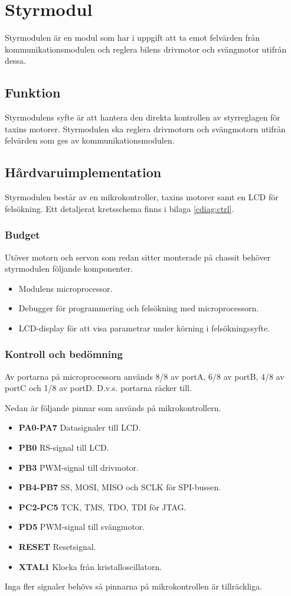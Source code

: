 \documentclass[designspec/spec.tex]{subfiles}
\begin{document}
\section{Styrmodul}
Styrmodulen är en modul som har i uppgift att ta emot felvärden från
kommunikationsmodulen och reglera bilens drivmotor och svängmotor utifrån
dessa.

\subsection{Funktion}
Styrmodulens syfte är att hantera den direkta kontrollen av styrreglagen för
taxins motorer. Styrmodulen ska reglera drivmotorn och svängmotorn utifrån
felvärden som ges av kommunikationsmodulen.

\subsection{Hårdvaruimplementation}
Styrmodulen består av en mikrokontroller, taxins motorer samt en LCD för
felsökning. Ett detaljerat kretsschema finns i bilaga \ref{cdiag:ctrl}.

\subsubsection{Budget}
Utöver motorn och servon som redan sitter monterade på chassit behöver
styrmodulen följande komponenter.
\begin{itemize}
	\item \textbf{\modMicrocontroller} Modulens microprocessor. 
    \item \textbf{\modJtag} Debugger för programmering och felsökning med
        microprocessorn. 
    \item \textbf{\modLcd} LCD-display för att visa parametrar under körning i
        felsökningssyfte.
\end{itemize}

\subsubsection{Kontroll och bedömning}
Av portarna på microprocessorn används 8/8 av portA, 6/8 av portB, 4/8 av portC
och 1/8 av portD. D.v.s. portarna räcker till.

Nedan är följande pinnar som används på mikrokontrollern.
\begin{itemize}
   \item \textbf{PA0-PA7} Datasignaler till LCD.
   \item \textbf{PB0} RS-signal till LCD.
   \item \textbf{PB3} PWM-signal till drivmotor.
   \item \textbf{PB4-PB7} SS, MOSI, MISO och SCLK för SPI-bussen.
   \item \textbf{PC2-PC5} TCK, TMS, TDO, TDI för JTAG.
   \item \textbf{PD5} PWM-signal till svängmotor.
   \item \textbf{RESET} Resetsignal.
   \item \textbf{XTAL1} Klocka från kristalloscillatorn.
\end{itemize}
Inga fler signaler behövs så pinnarna på mikrokontrollen är tillräckliga.
\end{document}
